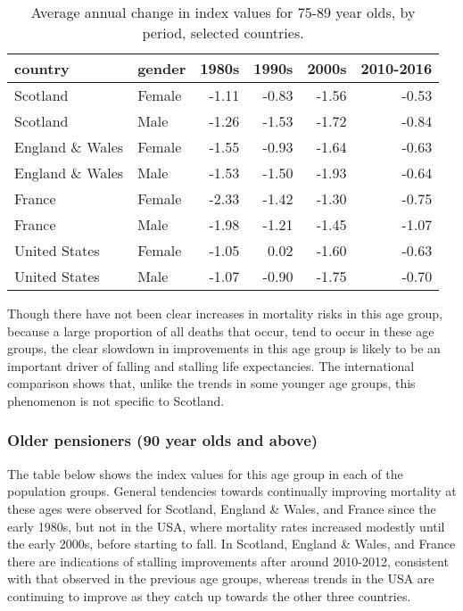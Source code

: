 \documentclass[]{article}
\begin{document}
\begin{table}

\caption{\label{tab:unnamed-chunk-10}Average annual change in index values for 75-89 year olds, by period, selected countries.}
\centering
\begin{tabular}[t]{l|l|r|r|r|r}
\hline
country & gender & 1980s & 1990s & 2000s & 2010-2016\\
\hline
Scotland & Female & -1.11 & -0.83 & -1.56 & -0.53\\
\hline
Scotland & Male & -1.26 & -1.53 & -1.72 & -0.84\\
\hline
England \& Wales & Female & -1.55 & -0.93 & -1.64 & -0.63\\
\hline
England \& Wales & Male & -1.53 & -1.50 & -1.93 & -0.64\\
\hline
France & Female & -2.33 & -1.42 & -1.30 & -0.75\\
\hline
France & Male & -1.98 & -1.21 & -1.45 & -1.07\\
\hline
United States & Female & -1.05 & 0.02 & -1.60 & -0.63\\
\hline
United States & Male & -1.07 & -0.90 & -1.75 & -0.70\\
\hline
\end{tabular}
\end{table}

Though there have not been clear increases in mortality risks in this
age group, because a large proportion of all deaths that occur, tend to
occur in these age groups, the clear slowdown in improvements in this
age group is likely to be an important driver of falling and stalling
life expectancies. The international comparison shows that, unlike the
trends in some younger age groups, this phenomenon is not specific to
Scotland.

\subsubsection{Older pensioners (90 year olds and
above)}\label{older-pensioners-90-year-olds-and-above}

The table below shows the index values for this age group in each of the
population groups. General tendencies towards continually improving
mortality at these ages were observed for Scotland, England \& Wales,
and France since the early 1980s, but not in the USA, where mortality
rates increased modestly until the early 2000s, before starting to fall.
In Scotland, England \& Wales, and France there are indications of
stalling improvements after around 2010-2012, consistent with that
observed in the previous age groups, whereas trends in the USA are
continuing to improve as they catch up towards the other three
countries.
\end{document}
